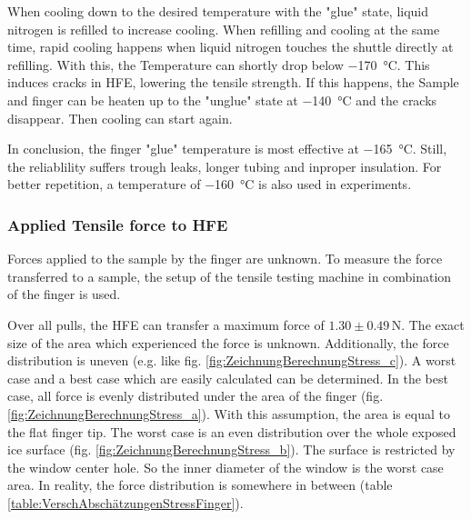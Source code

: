 When cooling down to the desired temperature with the "glue" state, liquid nitrogen is refilled to increase cooling. When refilling and cooling at the same time, rapid cooling happens when liquid nitrogen touches the shuttle directly at refilling. With this, the Temperature can shortly drop below \SI{-170}{\degreeCelsius}. This induces cracks in HFE, lowering the tensile strength. If this happens, the Sample and finger can be heaten up to the "unglue" state at \SI{-140}{\degreeCelsius} and the cracks disappear. Then cooling can start again.

In conclusion, the finger "glue" temperature is most effective at \SI{-165}{\degreeCelsius}. Still, the reliablility suffers trough leaks, longer tubing and inproper insulation. For better repetition, a temperature of \SI{-160}{\degreeCelsius} is also used in experiments.

\subsubsection{Applied Tensile force to HFE}

Forces applied to the sample by the finger are unknown. To measure the force transferred to a sample, the setup of the tensile testing machine in combination of the finger is used.

Over all pulls, the HFE can transfer a maximum force of $1.30\pm0.49\,\si{\newton}$. The exact size of the area which experienced the force is unknown. Additionally, the force distribution is uneven (e.g. like fig. \ref{fig:ZeichnungBerechnungStress_c}). A worst case and a best case which are easily calculated can be determined. In the best case, all force is evenly distributed under the area of the finger (fig. \ref{fig:ZeichnungBerechnungStress_a}). With this assumption, the area is equal to the flat finger tip. The worst case is an even distribution over the whole exposed ice surface (fig. \ref{fig:ZeichnungBerechnungStress_b}). The surface is restricted by the window center hole. So the inner diameter of the window is the worst case area. In reality, the force distribution is somewhere in between (table \ref{table:VerschAbschätzungenStressFinger}).

